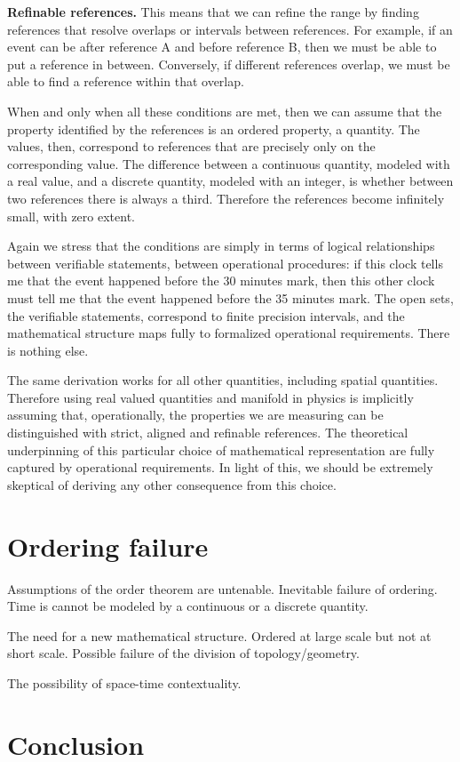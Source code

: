 \documentclass[10pt,twocolumn, nofootinbib]{revtex4-2}
\begin{document}
\textbf{Refinable references.} This means that we can refine the range by finding references that resolve overlaps or intervals between references. For example, if an event can be after reference A and before reference B, then we must be able to put a reference in between. Conversely, if different references overlap, we must be able to find a reference within that overlap.

When and only when all these conditions are met, then we can assume that the property identified by the references is an ordered property, a quantity. The values, then, correspond to references that are precisely only on the corresponding value. The difference between a continuous quantity, modeled with a real value, and a discrete quantity, modeled with an integer, is whether between two references there is always a third. Therefore the references become infinitely small, with zero extent.

Again we stress that the conditions are simply in terms of logical relationships between verifiable statements, between operational procedures: if this clock tells me that the event happened before the 30 minutes mark, then this other clock must tell me that the event happened before the 35 minutes mark. The open sets, the verifiable statements, correspond to finite precision intervals, and the mathematical structure maps fully to formalized operational requirements. There is nothing else.

The same derivation works for all other quantities, including spatial quantities. Therefore using real valued quantities and manifold in physics is implicitly assuming that, operationally, the properties we are measuring can be distinguished with strict, aligned and refinable references. The theoretical underpinning of this particular choice of mathematical representation are fully captured by operational requirements. In light of this, we should be extremely skeptical of deriving any other consequence from this choice.

\section{Ordering failure}

Assumptions of the order theorem are untenable. Inevitable failure of ordering. Time is cannot be modeled by a continuous or a discrete quantity.

The need for a new mathematical structure. Ordered at large scale but not at short scale. Possible failure of the division of topology/geometry.

The possibility of space-time contextuality.

\section{Conclusion}



\end{document}
